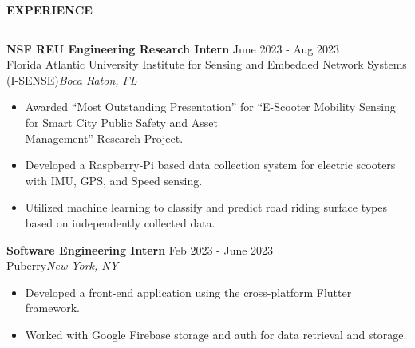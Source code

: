 \documentclass[10pt,letterpaper]{article}
\begin{document}

\medskip
\MakeUppercase{{\bf Experience}}
\medskip
\hrule
\begin{list}{}{\setlength{\leftmargin}{0em}}

    \item
          \textbf{NSF REU Engineering Research Intern} \hfill June 2023 - Aug 2023\\
          Florida Atlantic University Institute for Sensing and Embedded Network Systems (I-SENSE)\hfill \textit{Boca Raton, FL}
          \begin{itemize}
              \itemsep -3pt {}
              \item Awarded ``Most Outstanding Presentation'' for ``E-Scooter Mobility Sensing for Smart City Public Safety and Asset \\
                    Management'' Research Project.
              \item Developed a Raspberry-Pi based data collection system for electric scooters with IMU, GPS, and Speed sensing.
              \item Utilized machine learning to classify and predict road riding surface types based on independently collected data.
          \end{itemize}

    \item
          \textbf{Software Engineering Intern} \hfill Feb 2023 - June 2023\\
          Puberry\hfill \textit{New York, NY}
          \begin{itemize}
              \itemsep -3pt {}
              \item Developed a front-end application using the cross-platform Flutter framework. \
              \item Worked with Google Firebase storage and auth for data retrieval and storage.
          \end{itemize}
\end{list}


\end{document}
